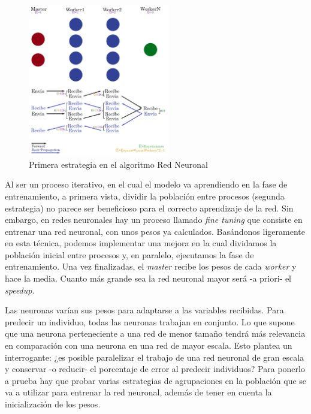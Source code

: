 	\begin{figure}[!h]
		\centering
		\includegraphics[width=0.55\textwidth]{images/chapter_3/redneu_mpi2}
		\caption{Primera estrategia en el algoritmo Red Neuronal}
		\label{fig:redneumpipipe}
	\end{figure}
	
	Al ser un proceso iterativo, en el cual el modelo va aprendiendo en la fase de entrenamiento, a primera vista, dividir la población entre procesos (segunda estrategia) no parece ser beneficioso para el correcto aprendizaje de la red. Sin embargo, en redes neuronales hay un proceso llamado \textit{fine tuning} \cite{malladi2023fine} que consiste en entrenar una red neuronal, con unos pesos ya calculados. Basándonos ligeramente en esta técnica, podemos implementar una mejora en la cual dividamos la población inicial entre procesos y, en paralelo, ejecutamos la fase de entrenamiento. Una vez finalizadas, el \textit{master} recibe los pesos de cada \textit{worker} y hace la media. Cuanto más grande sea la red neuronal mayor será -a priori- el \textit{speedup}.
		
	Las neuronas varían sus pesos para adaptarse a las variables recibidas. Para predecir un individuo, todas las neuronas trabajan en conjunto. Lo que supone que una neurona perteneciente a una red de menor tamaño tendrá más relevancia en comparación con una neurona en una red de mayor escala. Esto plantea un interrogante: ¿es posible paralelizar el trabajo de una red neuronal de gran escala y conservar -o reducir- el porcentaje de error al predecir individuos? Para ponerlo a prueba hay que probar varias estrategias de agrupaciones en la población que se va a utilizar para entrenar la red neuronal, además de tener en cuenta la inicialización de los pesos.
	
